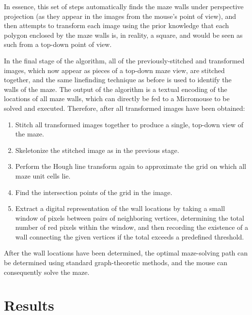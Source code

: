 \documentclass[10pt,twocolumn,letterpaper]{article}
\begin{document}
In essence, this set of steps automatically finds the maze walls under perspective projection (as they appear in the
images from the mouse's point of view), and then attempts to transform each image using the prior knowledge that each
polygon enclosed by the maze walls is, in reality, a square, and would be seen as such from a top-down point of view.

In the final stage of the algorithm, all of the previously-stitched and transformed images, which now appear as pieces
of a top-down maze view, are stitched together, and the same linefinding technique as before is used to identify the
walls of the maze.  The output of the algorithm is a textual encoding of the locations of all maze walls, which can
directly be fed to a Micromouse to be solved and executed.  Therefore, after all transformed images have been obtained:

\begin{enumerate}
	\item Stitch all transformed images together to produce a single, top-down view of the maze.
	\item Skeletonize the stitched image as in the previous stage.
	\item Perform the Hough line transform again to approximate the grid on which all maze unit cells lie.
	\item Find the intersection points of the grid in the image.
	\item Extract a digital representation of the wall locations by taking a small window of pixels between pairs of
	neighboring vertices, determining the total number of red pixels within the window, and then recording the existence
	of a wall connecting the given vertices if the total exceeds a predefined threshold.
\end{enumerate}

After the wall locations have been determined, the optimal maze-solving path can be determined using standard 
graph-theoretic methods, and the mouse can consequently solve the maze.

\section{Results}
\label{sec:results}
\end{document}
